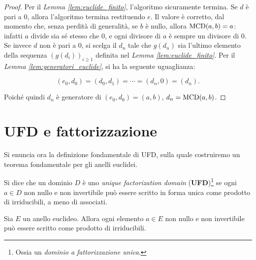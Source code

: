 \begin{proof}
    Per il \textit{Lemma \ref{lem:euclide_finito}}, l'algoritmo sicuramente termina.
    Se $d$ è pari a $0$, allora l'algoritmo termina restituendo $e$. Il valore è
    corretto, dal momento che, senza perdità di generalità, se $b$ è nullo, allora
    $\operatorname{MCD}(a, b)=a$: infatti $a$ divide sia sé stesso che $0$, e ogni divisore di $a$ è
    sempre un divisore di $0$. \\

    Se invece $d$ non è pari a $0$, si scelga il $d_n$ tale che $g(d_n)$ sia l'ultimo
    elemento della sequenza $(g(d_i))_{i\geq1}$ definita nel \textit{Lemma \ref{lem:euclide_finito}}. Per il \textit{Lemma \ref{lem:generatori_euclide}},
    si ha la seguente uguaglianza:

    \[ (e_0, d_0) = (d_0, d_1) = \cdots = (d_n, 0) = (d_n). \]

    \vskip 0.1in

    Poiché quindi $d_n$ è generatore di $(e_0, d_0)=(a,b)$, $d_n = \operatorname{MCD}(a,b)$.
\end{proof}

\section{UFD e fattorizzazione}

Si enuncia ora la definizione fondamentale di UFD, sulla
quale costruiremo un teorema fondamentale per gli anelli
euclidei.

\begin{definition}
    Si dice che un dominio $D$ è uno \textit{unique factorization domain} (\textbf{UFD})\footnote{Ossia
        un \textit{dominio a fattorizzazione unica}.} se ogni $a \in D$ non nullo e non invertibile può essere scritto
    in forma unica come prodotto di irriducibili, a meno di associati.
\end{definition}

\begin{lemma}
    \label{lem:fattorizzazione}
    Sia $E$ un anello euclideo. Allora ogni elemento $a \in E$ non nullo e
    non invertibile può essere scritto come prodotto di irriducibili.
\end{lemma}

